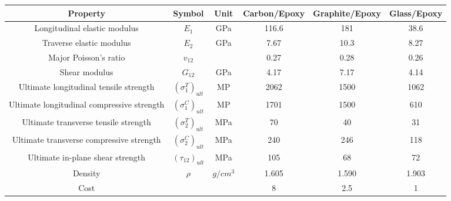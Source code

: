 \documentclass[USenglish]{article}
\begin{document}
\begin{adjustbox}{width={\textwidth},totalheight={\textheight},keepaspectratio}
\begin{tabular}{cccccc}
	\toprule
	Property								   & Symbol				  & Unit  &  Carbon/Epoxy&  Graphite/Epoxy  &  Glass/Epoxy   \\
	\midrule																								  
	Longitudinal elastic modulus			   & $E_1$				  & GPa   &  116.6       &  181             &  38.6           \\
	Traverse elastic modulus				   & $E_2$				  & GPa   &  7.67        &  10.3            &  8.27           \\
	Major Poisson's ratio					   & $v_{12}$			  &       &  0.27        &  0.28            &  0.26           \\
	Shear modulus							   & $G_{12}$			  & GPa   &  4.17        &  7.17            &  4.14           \\
	Ultimate longitudinal tensile strength     & $(\sigma_1^T)_{ult}$ & MP    &  2062        &  1500            &  1062            \\
	Ultimate longitudinal compressive strength & $(\sigma_1^C)_{ult}$ & MP    &  1701        &  1500            &  610             \\
	Ultimate transverse tensile strength       & $(\sigma_2^T)_{ult}$ & MPa   &  70          &  40              &  31              \\
	Ultimate transverse compressive strength   & $(\sigma_2^C)_{ult}$ & MPa   &  240         &  246             &  118              \\
	Ultimate in-plane shear strength           & $(\tau_{12})_{ult}$  & MPa   &  105         &  68              &  72               \\
	Density                                    & $\rho$               & $g/cm^3$ &  1.605    &  1.590           &  1.903               \\
	Cost                                       &                      &       &  8           &  2.5             &  1               \\
	\bottomrule
\end{tabular}
\end{adjustbox}
\label{tab:mat}
\end{document}

